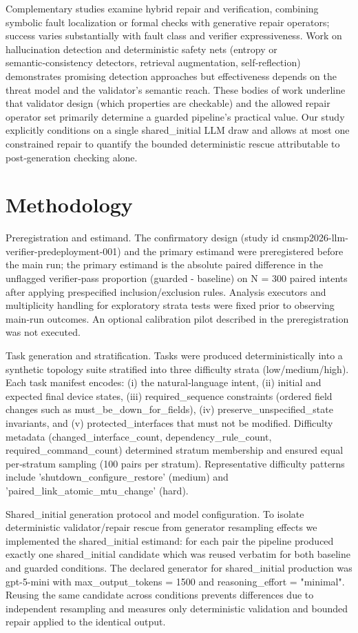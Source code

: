 \documentclass[conference]{IEEEtran}
\begin{document}
Complementary studies examine hybrid repair and verification, combining symbolic fault localization or formal checks with generative repair operators; success varies substantially with fault class and verifier expressiveness. Work on hallucination detection and deterministic safety nets (entropy or semantic‑consistency detectors, retrieval augmentation, self‑reflection) demonstrates promising detection approaches but effectiveness depends on the threat model and the validator's semantic reach. These bodies of work underline that validator design (which properties are checkable) and the allowed repair operator set primarily determine a guarded pipeline's practical value. Our study explicitly conditions on a single shared\_initial LLM draw and allows at most one constrained repair to quantify the bounded deterministic rescue attributable to post‑generation checking alone.

\section{Methodology}
Preregistration and estimand. The confirmatory design (study id cnsmp2026-llm-verifier-predeployment-001) and the primary estimand were preregistered before the main run; the primary estimand is the absolute paired difference in the unflagged verifier‑pass proportion (guarded - baseline) on N = 300 paired intents after applying prespecified inclusion/exclusion rules. Analysis executors and multiplicity handling for exploratory strata tests were fixed prior to observing main‑run outcomes. An optional calibration pilot described in the preregistration was not executed.

Task generation and stratification. Tasks were produced deterministically into a synthetic topology suite stratified into three difficulty strata (low/medium/high). Each task manifest encodes: (i) the natural‑language intent, (ii) initial and expected final device states, (iii) required\_sequence constraints (ordered field changes such as must\_be\_down\_for\_fields), (iv) preserve\_unspecified\_state invariants, and (v) protected\_interfaces that must not be modified. Difficulty metadata (changed\_interface\_count, dependency\_rule\_count, required\_command\_count) determined stratum membership and ensured equal per‑stratum sampling (100 pairs per stratum). Representative difficulty patterns include 'shutdown\_configure\_restore' (medium) and 'paired\_link\_atomic\_mtu\_change' (hard).

Shared\_initial generation protocol and model configuration. To isolate deterministic validator/repair rescue from generator resampling effects we implemented the shared\_initial estimand: for each pair the pipeline produced exactly one shared\_initial candidate which was reused verbatim for both baseline and guarded conditions. The declared generator for shared\_initial production was gpt-5-mini with max\_output\_tokens = 1500 and reasoning\_effort = "minimal". Reusing the same candidate across conditions prevents differences due to independent resampling and measures only deterministic validation and bounded repair applied to the identical output.
\end{document}
